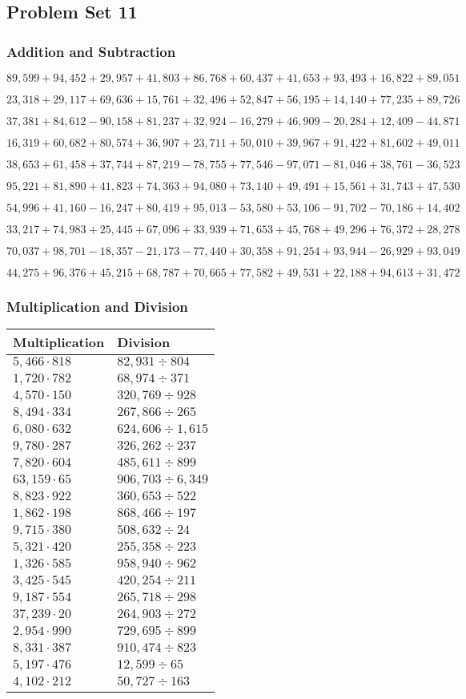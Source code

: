 \hypertarget{problem-set-11-4}{%
\subsection{Problem Set 11}\label{problem-set-11-4}}

\hypertarget{addition-and-subtraction-233}{%
\subsubsection{Addition and
Subtraction}\label{addition-and-subtraction-233}}

\(89,599+94,452+29,957+41,803+86,768+60,437+41,653+93,493+16,822+ 89,051\)

\(23,318+29,117+69,636+15,761+32,496+52,847+56,195+14,140+77,235+89,726\)

\(37,381+84,612-90,158+81,237+32,924-16,279+46,909-20,284+12,409-44,871\)

\(16,319+60,682+80,574+36,907+23,711+50,010+39,967+91,422+81,602+49,011\)

\(38,653+61,458+37,744+87,219-78,755+77,546-97,071-81,046+38,761-36,523\)

\(95,221+81,890+41,823+74,363+94,080+73,140+49,491+15,561+31,743+47,530\)

\(54,996+41,160-16,247+80,419+95,013-53,580+53,106-91,702-70,186+14,402\)

\(33,217+74,983+25,445+67,096+33,939+71,653+45,768+49,296+76,372+28,278\)

\(70,037+98,701-18,357-21,173-77,440+30,358+91,254+93,944-26,929+93,049\)

\(44,275+96,376+45,215+68,787+70,665+77,582+49,531+22,188+94,613+31,472\)

\hypertarget{multiplication-and-division-232}{%
\subsubsection{Multiplication and
Division}\label{multiplication-and-division-232}}

\begin{longtable}[]{@{}ll@{}}
\toprule
Multiplication & Division\tabularnewline
\midrule
\endhead
\(5,466\cdot818\) & \(82,931÷804\)\tabularnewline
\(1,720\cdot782\) & \(68,974÷371\)\tabularnewline
\(4,570\cdot150\) & \(320,769÷928\)\tabularnewline
\(8,494\cdot334\) & \(267,866÷265\)\tabularnewline
\(6,080\cdot632\) & \(624,606÷1,615\)\tabularnewline
\(9,780\cdot287\) & \(326,262÷237\)\tabularnewline
\(7,820\cdot604\) & \(485,611÷899\)\tabularnewline
\(63,159\cdot65\) & \(906,703÷6,349\)\tabularnewline
\(8,823\cdot922\) & \(360,653÷522\)\tabularnewline
\(1,862\cdot198\) & \(868,466÷197\)\tabularnewline
\(9,715\cdot380\) & \(508,632÷24\)\tabularnewline
\(5,321\cdot420\) & \(255,358÷223\)\tabularnewline
\(1,326\cdot585\) & \(958,940÷962\)\tabularnewline
\(3,425\cdot545\) & \(420,254÷211\)\tabularnewline
\(9,187\cdot554\) & \(265,718÷298\)\tabularnewline
\(37,239\cdot20\) & \(264,903÷272\)\tabularnewline
\(2,954\cdot990\) & \(729,695÷899\)\tabularnewline
\(8,331\cdot387\) & \(910,474÷823\)\tabularnewline
\(5,197\cdot476\) & \(12,599÷65\)\tabularnewline
\(4,102\cdot212\) & \(50,727÷163\)\tabularnewline
\bottomrule
\end{longtable}

